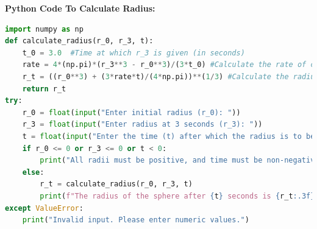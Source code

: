 \documentclass[journal]{IEEEtran}
\numberwithin{equation}{enumi}
\numberwithin{figure}{enumi}
\begin{document}
\textbf{Python Code To Calculate Radius:}
\begin{lstlisting}[language=Python]
import numpy as np
def calculate_radius(r_0, r_3, t):
    t_0 = 3.0  #Time at which r_3 is given (in seconds) 
    rate = 4*(np.pi)*(r_3**3 - r_0**3)/(3*t_0) #Calculate the rate of change of volume
    r_t = ((r_0**3) + (3*rate*t)/(4*np.pi))**(1/3) #Calculate the radius at time t
    return r_t
try:
    r_0 = float(input("Enter initial radius (r_0): "))
    r_3 = float(input("Enter radius at 3 seconds (r_3): "))
    t = float(input("Enter the time (t) after which the radius is to be found: "))
    if r_0 <= 0 or r_3 <= 0 or t < 0:
        print("All radii must be positive, and time must be non-negative.")
    else:
        r_t = calculate_radius(r_0, r_3, t)
        print(f"The radius of the sphere after {t} seconds is {r_t:.3f} units.")
except ValueError:
    print("Invalid input. Please enter numeric values.")
\end{lstlisting}
\end{document}
